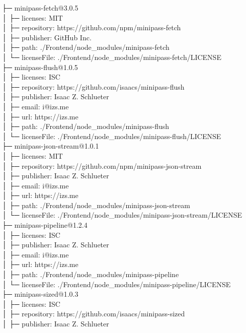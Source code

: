 ├─ minipass-fetch@3.0.5\\
│  ├─ licenses: MIT\\
│  ├─ repository: https://github.com/npm/minipass-fetch\\
│  ├─ publisher: GitHub Inc.\\
│  ├─ path: ./Frontend/node\_modules/minipass-fetch\\
│  └─ licenseFile: ./Frontend/node\_modules/minipass-fetch/LICENSE\\
├─ minipass-flush@1.0.5\\
│  ├─ licenses: ISC\\
│  ├─ repository: https://github.com/isaacs/minipass-flush\\
│  ├─ publisher: Isaac Z. Schlueter\\
│  ├─ email: i@izs.me\\
│  ├─ url: https://izs.me\\
│  ├─ path: ./Frontend/node\_modules/minipass-flush\\
│  └─ licenseFile: ./Frontend/node\_modules/minipass-flush/LICENSE\\
├─ minipass-json-stream@1.0.1\\
│  ├─ licenses: MIT\\
│  ├─ repository: https://github.com/npm/minipass-json-stream\\
│  ├─ publisher: Isaac Z. Schlueter\\
│  ├─ email: i@izs.me\\
│  ├─ url: https://izs.me\\
│  ├─ path: ./Frontend/node\_modules/minipass-json-stream\\
│  └─ licenseFile: ./Frontend/node\_modules/minipass-json-stream/LICENSE\\
├─ minipass-pipeline@1.2.4\\
│  ├─ licenses: ISC\\
│  ├─ publisher: Isaac Z. Schlueter\\
│  ├─ email: i@izs.me\\
│  ├─ url: https://izs.me\\
│  ├─ path: ./Frontend/node\_modules/minipass-pipeline\\
│  └─ licenseFile: ./Frontend/node\_modules/minipass-pipeline/LICENSE\\
├─ minipass-sized@1.0.3\\
│  ├─ licenses: ISC\\
│  ├─ repository: https://github.com/isaacs/minipass-sized\\
│  ├─ publisher: Isaac Z. Schlueter\\
